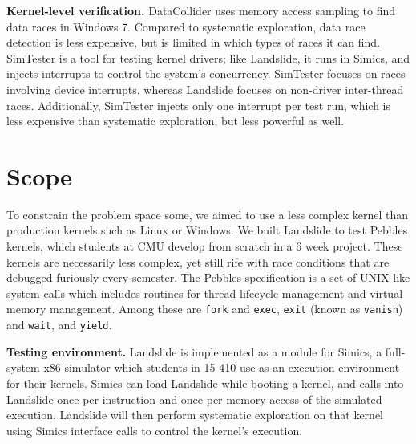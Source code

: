 \documentclass{llncs}
\begin{document}
{\bf Kernel-level verification.}
DataCollider \cite{datacollider} uses memory access sampling to find data races in Windows 7. Compared to systematic exploration, data race detection is less expensive, but is limited in which types of races it can find.
SimTester \cite{simtester} is a tool for testing kernel drivers; like Landslide, it runs in Simics, and injects interrupts to control the system's concurrency. SimTester focuses on races involving device interrupts, whereas Landslide focuses on non-driver inter-thread races. Additionally, SimTester injects only one interrupt per test run, which is less expensive than systematic exploration, but less powerful as well.

\squish
\section{Scope}
\squish


To constrain the problem space some, we aimed to use a less complex kernel than production kernels such as Linux or Windows. We built Landslide to test Pebbles kernels, which students at CMU develop from scratch in a 6 week project. These kernels are necessarily less complex, yet still rife with race conditions that are debugged furiously every semester.
The Pebbles specification \cite{kspec} is a set of UNIX-like system calls which includes routines for thread lifecycle management and virtual memory management. Among these are \texttt{fork} and \texttt{exec}, \texttt{exit} (known as \texttt{vanish}) and \texttt{wait}, and \texttt{yield}.

{\bf Testing environment.} Landslide is implemented as a module for Simics, a full-system x86 simulator which students in 15-410 use as an execution environment for their kernels. Simics can load Landslide while booting a kernel, and calls into Landslide once per instruction and once per memory access of the simulated execution. Landslide will then perform systematic exploration on that kernel using Simics interface calls to control the kernel's execution.
\end{document}
